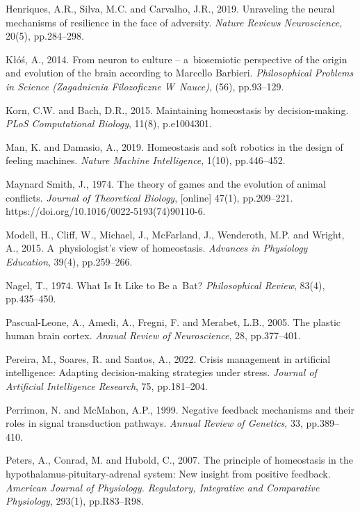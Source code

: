 Henriques, A.R., Silva, M.C. and Carvalho, J.R., 2019. Unraveling the neural mechanisms of resilience in the face of adversity. \textit{Nature Reviews Neuroscience}, 20(5), pp.284–298.



Kłóś, A., 2014. From neuron to culture -- a~biosemiotic perspective of the origin and evolution of the brain according to Marcello Barbieri. \textit{Philosophical Problems in Science (Zagadnienia Filozoficzne W~Nauce)}, (56), pp.93–129.



Korn, C.W. and Bach, D.R., 2015. Maintaining homeostasis by decision-making. \textit{PLoS Computational Biology}, 11(8), p.e1004301.



Man, K. and Damasio, A., 2019. Homeostasis and soft robotics in the design of feeling machines. \textit{Nature Machine Intelligence}, 1(10), pp.446–452.



Maynard Smith, J., 1974. The theory of games and the evolution of animal conflicts. \textit{Journal of Theoretical Biology}, [online] 47(1), pp.209–221. https://doi.org/10.1016/0022-5193(74)90110-6.



Modell, H., Cliff, W., Michael, J., McFarland, J., Wenderoth, M.P. and Wright, A., 2015. A~physiologist's view of homeostasis. \textit{Advances in Physiology Education}, 39(4), pp.259–266.



Nagel, T., 1974. What Is It Like to Be a~Bat? \textit{Philosophical Review}, 83(4), pp.435–450.



Pascual-Leone, A., Amedi, A., Fregni, F. and Merabet, L.B., 2005. The plastic human brain cortex. \textit{Annual Review of Neuroscience}, 28, pp.377–401.



Pereira, M., Soares, R. and Santos, A., 2022. Crisis management in artificial intelligence: Adapting decision-making strategies under stress. \textit{Journal of Artificial Intelligence Research}, 75, pp.181–204.



Perrimon, N. and McMahon, A.P., 1999. Negative feedback mechanisms and their roles in signal transduction pathways. \textit{Annual Review of Genetics}, 33, pp.389–410.



Peters, A., Conrad, M. and Hubold, C., 2007. The principle of homeostasis in the hypothalamus-pituitary-adrenal system: New insight from positive feedback. \textit{American Journal of Physiology. Regulatory, Integrative and Comparative Physiology}, 293(1), pp.R83–R98.



